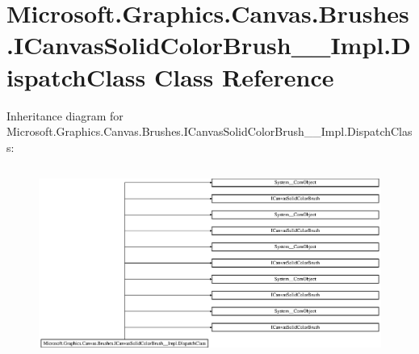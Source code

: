\hypertarget{class_microsoft_1_1_graphics_1_1_canvas_1_1_brushes_1_1_i_canvas_solid_color_brush_____impl_1_1_dispatch_class}{}\section{Microsoft.\+Graphics.\+Canvas.\+Brushes.\+I\+Canvas\+Solid\+Color\+Brush\+\_\+\+\_\+\+Impl.\+Dispatch\+Class Class Reference}
\label{class_microsoft_1_1_graphics_1_1_canvas_1_1_brushes_1_1_i_canvas_solid_color_brush_____impl_1_1_dispatch_class}
Inheritance diagram for Microsoft.\+Graphics.\+Canvas.\+Brushes.\+I\+Canvas\+Solid\+Color\+Brush\+\_\+\+\_\+\+Impl.\+Dispatch\+Class\+:\begin{figure}[H]
\begin{center}
\leavevmode
\includegraphics[height=6.324435cm]{class_microsoft_1_1_graphics_1_1_canvas_1_1_brushes_1_1_i_canvas_solid_color_brush_____impl_1_1_dispatch_class}
\end{center}
\end{figure}
